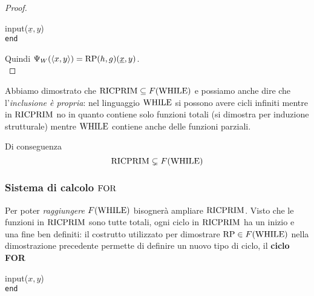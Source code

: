 \begin{proof}
	\begin{center}
		\begin{minipage}{0.85\textwidth}
			\begin{tcolorbox}[colback=white,sharp corners,boxrule=.3mm]
				\begin{algorithm}[H]
					\SetAlgoNoEnd
					input($\underline{x},y$) \\
					\texttt{end}
				\end{algorithm}
			\end{tcolorbox}
		\end{minipage}
	\end{center}
	
	Quindi $\Psi_W (\langle x,y \rangle) = \text{RP} (h,g) (\underline{x}, y)$. \\
\end{proof}

Abbiamo dimostrato che $\text{RICPRIM} \subseteq F(\text{WHILE})$ e possiamo anche dire che l'\textit{inclusione è propria}: nel linguaggio $\text{WHILE}$ si possono avere cicli infiniti mentre in $\text{RICPRIM}$ no in quanto contiene solo funzioni totali (si dimostra per induzione strutturale) mentre $\text{WHILE}$ contiene anche delle funzioni parziali. 

Di conseguenza
$$ \text{RICPRIM} \subsetneq F(\text{WHILE}) $$

\subsubsection{Sistema di calcolo $\text{FOR}$}

Per poter \textit{raggiungere} $F(\text{WHILE})$ bisognerà ampliare $\text{RICPRIM}$. Visto che le funzioni in $\text{RICPRIM}$ sono tutte totali, ogni ciclo in $\text{RICPRIM}$ ha un inizio e una fine ben definiti: il costrutto utilizzato per dimostrare $\text{RP} \in F(\text{WHILE})$ nella dimostrazione precedente permette di definire un nuovo tipo di ciclo, il \textbf{ciclo FOR}
\begin{center}
	\begin{minipage}{.85\textwidth}
		\begin{tcolorbox}[colback=white,sharp corners,boxrule=.3mm]
			\begin{algorithm}[H]
				\SetAlgoNoEnd
				input($x,y$) \\
				\texttt{end}
			\end{algorithm}
		\end{tcolorbox} 
	\end{minipage}
\end{center}

